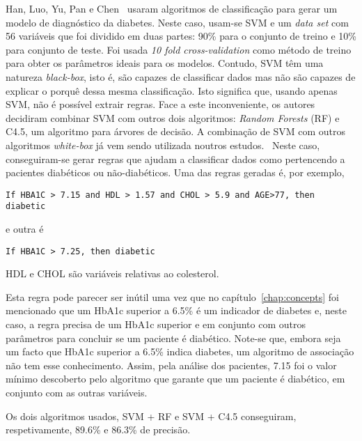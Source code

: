 Han, Luo, Yu, Pan e Chen~\cite{svm} usaram algoritmos de classificação para gerar um modelo de diagnóstico da diabetes. Neste caso, usam-se \ac{SVM} e um \textit{data set} com 56 variáveis que foi dividido em duas partes: 90\% para o conjunto de treino e 10\% para conjunto de teste. Foi usada \textit{10 fold cross-validation} como método de treino para obter os parâmetros ideais para os modelos. Contudo, \ac{SVM} têm uma natureza \textit{black-box}, isto é, são capazes de classificar dados mas não são capazes de explicar o porquê dessa mesma classificação. Isto significa que, usando apenas \ac{SVM}, não é possível extrair regras. Face a este inconveniente, os autores decidiram combinar \ac{SVM} com outros dois algoritmos: \textit{Random Forests} (RF) e C4.5, um algoritmo para árvores de decisão. A combinação de \ac{SVM} com outros algoritmos \textit{white-box} já vem sendo utilizada noutros estudos.~\cite{svm1, svm2} Neste caso, conseguiram-se gerar regras que ajudam a classificar dados como pertencendo a pacientes diabéticos ou não-diabéticos. Uma das regras geradas é, por exemplo, 
\begin{lstlisting}
If HBA1C > 7.15 and HDL > 1.57 and CHOL > 5.9 and AGE>77, then diabetic
\end{lstlisting}

e outra é

\begin{lstlisting}
If HBA1C > 7.25, then diabetic
\end{lstlisting}
HDL e CHOL são variáveis relativas ao colesterol.

Esta regra pode parecer ser inútil uma vez que no capítulo~\ref{chap:concepts} foi mencionado que um \ac{HbA1c} superior a 6.5\% é um indicador de diabetes e, neste caso, a regra precisa de um \ac{HbA1c} superior e em conjunto com outros parâmetros para concluir se um paciente é diabético. Note-se que, embora seja um facto que \ac{HbA1c} superior a 6.5\% indica diabetes, um algoritmo de associação não tem esse conhecimento. Assim, pela análise dos pacientes, 7.15 foi o valor mínimo descoberto pelo algoritmo que garante que um paciente é diabético, em conjunto com as outras variáveis.

Os dois algoritmos usados, \ac{SVM} + RF e \ac{SVM} + C4.5 conseguiram, respetivamente, 89.6\% e 86.3\% de precisão.


